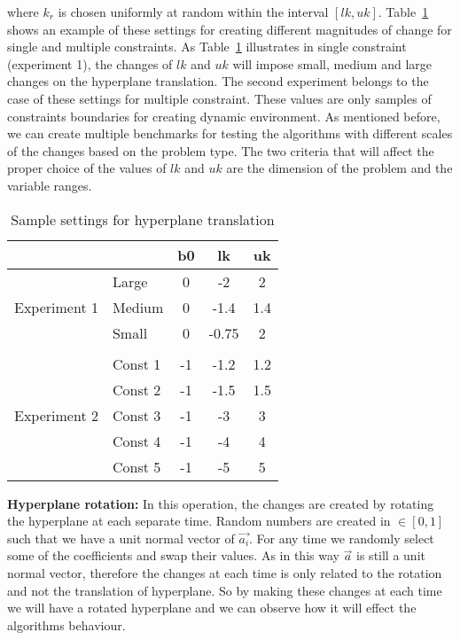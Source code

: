 \documentclass[review]{elsarticle}
\begin{document}
where 
$k_{r}$
is chosen uniformly at random within the interval $[lk,uk]$. Table~\ref{tab:Settings-bk} shows an example of these settings for creating different magnitudes of change for single and multiple constraints. 
As Table~\ref{tab:Settings-bk} illustrates in single constraint (experiment 1), the changes of $lk$ and $uk$ will impose small, medium and large changes on the hyperplane translation. The second experiment belongs to the case of these settings for multiple constraint. These values are only samples of constraints boundaries for creating dynamic environment. As mentioned before, we can create multiple benchmarks for testing the algorithms with different scales of the changes based on the problem type. 
The two criteria that will affect the proper choice of the values of $lk$ and $uk$ are the dimension of the problem and the variable ranges. 
\begin{table}[htbp]
\centering
\caption{\small Sample settings for hyperplane translation}
\begin{tabular}{l|lccc}
             &         & b0 & lk    & uk    \\\hline
             & Large   & 0  & -2    & 2     \\
Experiment 1 & Medium  & 0  & -1.4  & 1.4   \\
             & Small   & 0  & -0.75 & 2     \\
\\\hline
             & Const 1 & -1 & -1.2  & 1.2   \\
             & Const 2 & -1 & -1.5  & 1.5  \\
Experiment 2 & Const 3 & -1 & -3    & 3     \\
             & Const 4 & -1 & -4    & 4     \\
             & Const 5 & -1 & -5    & 5    
\end{tabular}
\label{tab:Settings-bk}%
\end{table}

\textbf{Hyperplane rotation:}
In this operation, the changes are created by rotating the hyperplane at each separate time. Random numbers are created in $\in [0,1]$ such that we have a unit normal vector of $\vec{a_i}$.
For any time we randomly select some of the coefficients and swap their values. As in this way $\vec{a}$ is still a unit normal vector, therefore the changes at each time is only related to the rotation and not the translation of hyperplane. 
So by making these changes at each time we will have a rotated hyperplane and we can observe how it will effect the algorithms behaviour. 
\end{document}
